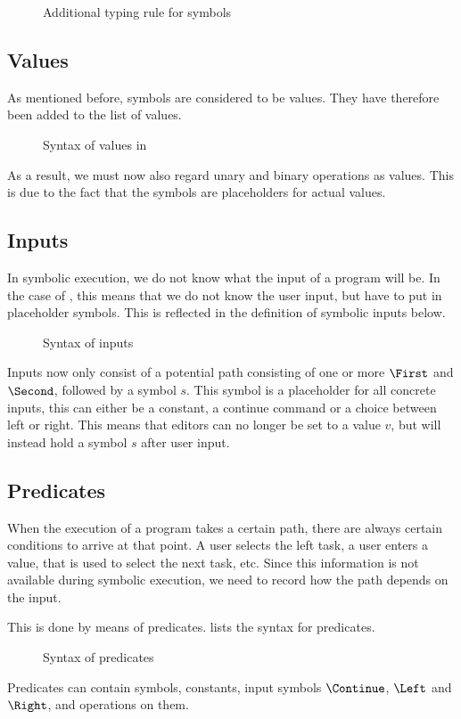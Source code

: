 \begin{figure}
\caption{Additional typing rule for symbols}
  \label{fig:typingsymbol}
\end{figure}

\subsection{Values}

As mentioned before, symbols are considered to be values.
They have therefore been added to the list of values.

\begin{figure}
\caption{Syntax of values in \TOPHAT}
  \label{fig:syntaxvalues}
\end{figure}

As a result, we must now also regard unary and binary operations as values.
This is due to the fact that the symbols are placeholders for actual values.


\subsection{Inputs}

In symbolic execution, we do not know what the input of a program will be.
In the case of \TOPHAT, this means that we do not know the user input, but have to put in placeholder symbols.
This is reflected in the definition of symbolic inputs below.

\begin{figure}
\caption{Syntax of inputs}
  \label{fig:syntaxinputs}
\end{figure}

Inputs now only consist of a potential path consisting of one or more $\First$ and $\Second$,
followed by a symbol $s$.
This symbol is a placeholder for all concrete inputs, this can either be a constant, a continue command or a choice between left or right.
This means that editors can no longer be set to a value $v$, but will instead hold a symbol $s$ after user input.


\subsection{Predicates}

When the execution of a \TOPHAT program takes a certain path, there are always certain conditions to arrive at that point.
A user selects the left task, a user enters a value, that is used to select the next task, etc.
Since this information is not available during symbolic execution, we need to record how the path depends on the input.

This is done by means of predicates.
 lists the syntax for predicates.

\begin{figure}
\caption{Syntax of predicates}
  \label{fig:syntaxpredicates}
\end{figure}

Predicates can contain symbols, constants, input symbols $\Continue$, $\Left$ and $\Right$, and operations on them.
